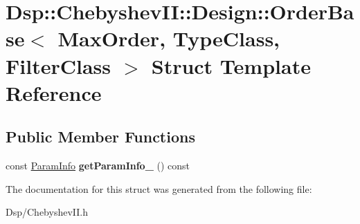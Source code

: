 \hypertarget{structDsp_1_1ChebyshevII_1_1Design_1_1OrderBase}{\section{Dsp\-:\-:Chebyshev\-I\-I\-:\-:Design\-:\-:Order\-Base$<$ Max\-Order, Type\-Class, Filter\-Class $>$ Struct Template Reference}
\label{structDsp_1_1ChebyshevII_1_1Design_1_1OrderBase}
}
\subsection*{Public Member Functions}
\begin{DoxyCompactItemize}
\item 
\hypertarget{structDsp_1_1ChebyshevII_1_1Design_1_1OrderBase_ad110c2d9018ebc94b1f0e8ed96815beb}{const \hyperlink{classDsp_1_1ParamInfo}{Param\-Info} {\bfseries get\-Param\-Info\-\_} () const }\label{structDsp_1_1ChebyshevII_1_1Design_1_1OrderBase_ad110c2d9018ebc94b1f0e8ed96815beb}

\end{DoxyCompactItemize}


The documentation for this struct was generated from the following file\-:\begin{DoxyCompactItemize}
\item 
Dsp/Chebyshev\-I\-I.\-h\end{DoxyCompactItemize}
